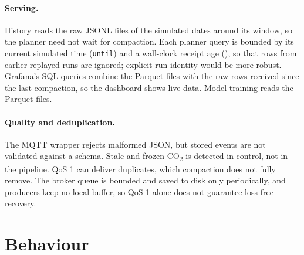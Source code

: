 \documentclass[11pt,a4paper]{article}
\begin{document}
\paragraph{Serving.}
History reads the raw JSONL files of the simulated dates around its window, so the planner need not wait for compaction. Each planner query is bounded by its current simulated time (\texttt{until}) and a wall-clock receipt age (\protect{}), so that rows from earlier replayed runs are ignored; explicit run identity would be more robust. Grafana's SQL queries combine the Parquet files with the raw rows received since the last compaction, so the dashboard shows live data. Model training reads the Parquet files.

\paragraph{Quality and deduplication.}
The MQTT wrapper rejects malformed JSON, but stored events are not validated against a schema. Stale and frozen CO\textsubscript{2} is detected in control, not in the pipeline. QoS 1 can deliver duplicates, which compaction does not fully remove. The broker queue is bounded and saved to disk only periodically, and producers keep no local buffer, so QoS 1 alone does not guarantee loss-free recovery.

\section{Behaviour}
\end{document}
